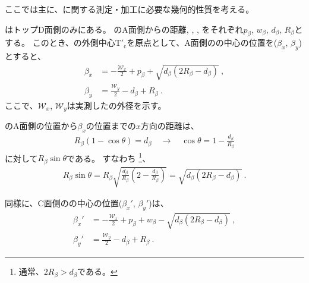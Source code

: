 

ここでは主に、\textbf{\EndFaceBoring}に関する測定・加工に必要な幾何的性質を考える。



\EndFaceBoring はトップD面側のみにある。
\EndFaceBoring のA面側からの距離, \EndFaceBoringWidth, \EndFaceBoringDepth, \EndFaceBoringCornerR をそれぞれ$p_\beta$, $w_\beta$, $d_\beta$, $R_\beta$とする。
このとき、\TopEndFace の外側中心T$'_\mathrm c$を原点として、A面側の\EndFaceBoringCornerR の中心の位置を($\beta_x$, $\beta_y$)とすると、
\begin{align*}
  \beta_x &= -\frac{\mathcal W_x}2+p_\beta+\sqrt{d_\beta(2R_\beta-d_\beta)}\ ,\\
  \beta_y &= \frac{\mathcal W_y}2-d_\beta+R_\beta\ .
\end{align*}
ここで、$\mathcal W_x$, $\mathcal W_y$は実測した\TopEndFace の外径を示す。
\begin{hosoku}
\EndFaceBoring のA面側の位置から$\beta_x$の位置までの$x$方向の距離は、
\begin{align*}
  R_\beta(1-\cos\theta) = d_\beta\quad
  \longrightarrow\quad
  \cos\theta = 1-\frac{d_\beta}{R_\beta}
\end{align*}
に対して$R_\beta\sin\theta$である。
すなわち
\footnote{通常、$2R_\beta > d_\beta$である。}、
\begin{align*}
  R_\beta\sin\theta
  = R_\beta\sqrt{\frac{d_\beta}{R_\beta}\left(2-\frac{d_\beta}{R_\beta}\right)}
  = \sqrt{d_\beta(2R_\beta-d_\beta)}\ .
\end{align*}
\end{hosoku}
同様に、C面側の\EndFaceBoringCornerR の中心の位置($\beta_x'$, $\beta_y'$)は、
\begin{align*}
  \beta_x' &= -\frac{\mathcal W_x}2+p_\beta+w_\beta-\sqrt{d_\beta(2R_\beta-d_\beta)}\ ,\\
  \beta_y' &= \frac{\mathcal W_y}2-d_\beta+R_\beta\ .
\end{align*}



